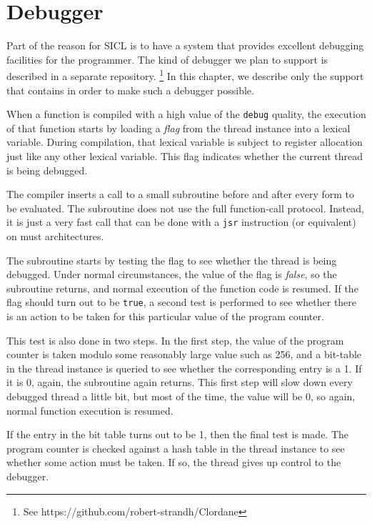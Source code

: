 \chapter{Debugger}
\label{chap-debugger}

Part of the reason for SICL is to have a system that provides
excellent debugging facilities for the programmer.  The kind of
debugger we plan to support is described in a separate repository.%
\footnote{See https://github.com/robert-strandh/Clordane}  In this
chapter, we describe only the support that \sysname{} contains in
order to make such a debugger possible.

When a function is compiled with a high value of the \texttt{debug}
quality, the execution of that function starts by loading a
\emph{flag} from the thread instance into a lexical variable.  During
compilation, that lexical variable is subject to register allocation
just like any other lexical variable.  This flag indicates whether the
current thread is being debugged.

The compiler inserts a call to a small subroutine before and after
every form to be evaluated.  The subroutine does not use the full
\commonlisp{} function-call protocol.  Instead, it is just a very fast
call that can be done with a \texttt{jsr} instruction (or equivalent)
on must architectures.

The subroutine starts by testing the flag to see whether the thread is
being debugged.  Under normal circumstances, the value of the flag is
\emph{false}, so the subroutine returns, and normal execution of the
function code is resumed.  If the flag should turn out to be
\texttt{true}, a second test is performed to see whether there is an
action to be taken for this particular value of the program counter.

This test is also done in two steps.  In the first step, the value of
the program counter is taken modulo some reasonably large value such
as 256, and a bit-table in the thread instance is queried to see
whether the corresponding entry is a 1.  If it is 0, again, the
subroutine again returns.  This first step will slow down every
debugged thread a little bit, but most of the time, the value will be
0, so again, normal function execution is resumed.

If the entry in the bit table turns out to be 1, then the final test
is made.  The program counter is checked against a hash table in the
thread instance to see whether some action must be taken.  If so, the
thread gives up control to the debugger.


